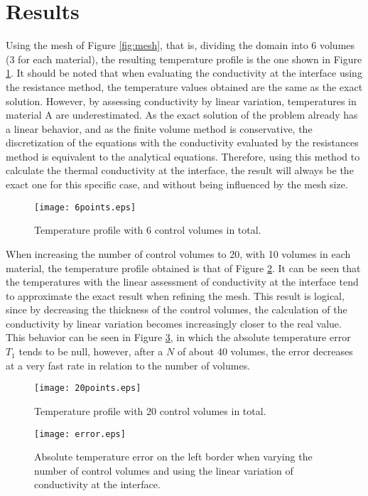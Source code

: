 \section{Results}

Using the mesh of Figure \ref{fig:mesh}, that is, dividing the domain into 6 volumes (3 for each material), the resulting temperature profile is the one shown in Figure \ref{fig:6points}.
It should be noted that when evaluating the conductivity at the interface using the resistance method, the temperature values obtained are the same as the exact solution.
However, by assessing conductivity by linear variation, temperatures in material A are underestimated.
As the exact solution of the problem already has a linear behavior, and as the finite volume method is conservative, the discretization of the equations with the conductivity evaluated by the resistances method is equivalent to the analytical equations.
Therefore, using this method to calculate the thermal conductivity at the interface, the result will always be the exact one for this specific case, and without being influenced by the mesh size.

\begin{figure}[H]
    \centering
    \texttt{[image: 6points.eps]}
    \caption{Temperature profile with 6 control volumes in total.}
    \label{fig:6points}
\end{figure}

When increasing the number of control volumes to 20, with 10 volumes in each material, the temperature profile obtained is that of Figure \ref{fig:20points}.
It can be seen that the temperatures with the linear assessment of conductivity at the interface tend to approximate the exact result when refining the mesh.
This result is logical, since by decreasing the thickness of the control volumes, the calculation of the conductivity by linear variation becomes increasingly closer to the real value.
This behavior can be seen in Figure \ref{fig:error}, in which the absolute temperature error $T_1$ tends to be null, however, after a $N$ of about 40 volumes, the error decreases at a very fast rate in relation to the number of volumes.

\begin{figure}[H]
    \centering
    \texttt{[image: 20points.eps]}
    \caption{Temperature profile with 20 control volumes in total.}
    \label{fig:20points}
\end{figure}

\begin{figure}[H]
    \centering
    \texttt{[image: error.eps]}
    \caption{Absolute temperature error on the left border when varying the number of control volumes and using the linear variation of conductivity at the interface.}
    \label{fig:error}
\end{figure}
